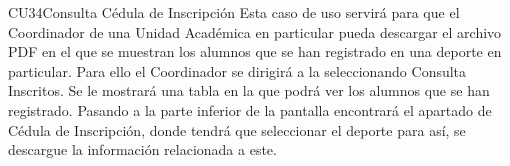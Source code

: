 \begin{UseCase}{CU34}{Consulta Cédula de Inscripción}{
		\noindent Esta caso de uso servirá para que el Coordinador de una Unidad Académica en particular pueda descargar el archivo PDF en el que se muestran los alumnos que se han registrado en una deporte en particular.
		Para ello el Coordinador se dirigirá a la  seleccionando Consulta Inscritos. Se le mostrará una tabla en la que podrá ver los alumnos que se han registrado. Pasando a la parte inferior de la pantalla encontrará el apartado de Cédula de Inscripción, donde tendrá que seleccionar el deporte para así, se descargue la información relacionada a este.
	} \label{CU34_evento}

		\end{UseCase}
	
